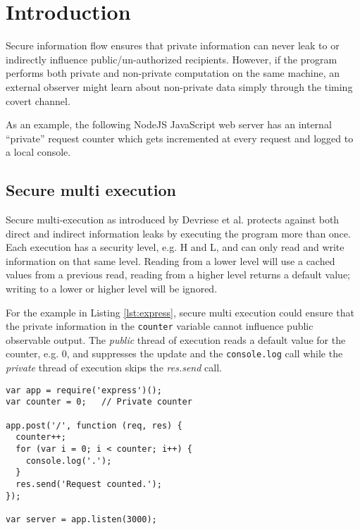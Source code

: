 \documentclass[10pt,preprint]{sigplanconf}
\title{\mytitle}
\begin{document}
\maketitle


\section{Introduction}

Secure information flow ensures that private information can never leak to or indirectly influence public/un-authorized recipients.  However, if the program performs both private and non-private computation on the same machine, an external observer might learn about non-private data simply through the timing covert channel.

As an example, the following NodeJS JavaScript web server has an internal ``private'' request counter which gets incremented at every request and logged to a local console.

\subsection{Secure multi execution}

Secure multi-execution as introduced by Devriese et al. \cite{devriese2010} protects against both direct and indirect information leaks by executing the program more than once.  Each execution has a security level, e.g. H and L, and can only read and write information on that same level.  Reading from a lower level will use a cached values from a previous read, reading from a higher level returns a default value; writing to a lower or higher level will be ignored.

For the example in Listing \ref{lst:express}, secure multi execution could ensure that the private information in the \verb+counter+ variable cannot influence public observable output.  The \emph{public} thread of execution reads a default value for the counter, e.g. 0, and suppresses the update and the \verb+console.log+ call while the \emph{private} thread of execution skips the \emph{res.send} call.

\begin{lstlisting}[float,label=lst:express,caption={JavaScript Server Code which leaks the value of the private request counter via the timing covert channel.}]
var app = require('express')();
var counter = 0;   // Private counter

app.post('/', function (req, res) {
  counter++;
  for (var i = 0; i < counter; i++) {
    console.log('.');
  }
  res.send('Request counted.');
});

var server = app.listen(3000);
\end{lstlisting}
\end{document}
